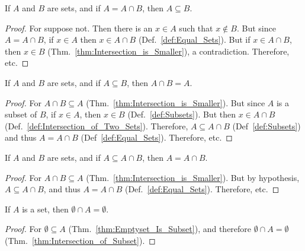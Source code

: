         \begin{theorem}
            \label{thm:Intersection_is_Equal}%
            If $A$ and $B$ are sets, and if
            $A=A\cap{B}$, then $A\subseteq{B}$.
        \end{theorem}
        \begin{proof}
            For suppose not. Then there is an $x\in{A}$ such
            that $x\notin{B}$. But since $A=A\cap{B}$,
            if $x\in{A}$ then $x\in{A}\cap{B}$
            (Def.~\ref{def:Equal_Sets}). But if
            $x\in{A}\cap{B}$, then $x\in{B}$
            (Thm.~\ref{thm:Intersection_is_Smaller}),
            a contradiction. Therefore, etc.
        \end{proof}
        \begin{theorem}
            \label{thm:Intersection_of_Subset}%
            If $A$ and $B$ are sets, and if
            $A\subseteq{B}$, then $A\cap{B}=A$.
        \end{theorem}
        \begin{proof}
            For $A\cap{B}\subseteq{A}$
            (Thm.~\ref{thm:Intersection_is_Smaller}). But
            since $A$ is a subset of $B$, if $x\in{A}$, then
            $x\in{B}$ (Def.~\ref{def:Subsets}). But then
            $x\in{A}\cap{B}$
            (Def.~\ref{def:Intersection_of_Two_Sets}). Therefore,
            $A\subseteq{A}\cap{B}$ (Def~\ref{def:Subsets})
            and thus $A=A\cap{B}$ (Def~\ref{def:Equal_Sets}).
            Therefore, etc.
        \end{proof}
        \begin{theorem}
            \label{thm:Conv_Intersection_is_Smaller}%
            If $A$ and $B$ are sets, and if
            $A\subseteq{A}\cap{B}$, then $A=A\cap{B}$.
        \end{theorem}
        \begin{proof}
            For $A\cap{B}\subseteq{A}$
            (Thm.~\ref{thm:Intersection_is_Smaller}). But
            by hypothesis, $A\subseteq{A}\cap{B}$, and thus
            $A=A\cap{B}$ (Def.~\ref{def:Equal_Sets}).
            Therefore, etc.
        \end{proof}
        \begin{theorem}
            If $A$ is a set, then $\emptyset\cap{A}=\emptyset$.
        \end{theorem}
        \begin{proof}
            For $\emptyset\subseteq{A}$ (Thm.~\ref{thm:Emptyset_Is_Subset}), and
            therefore $\emptyset\cap{A}=\emptyset$
            (Thm.~\ref{thm:Intersection_of_Subset}).
        \end{proof}
